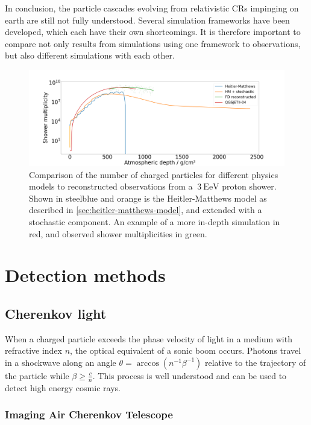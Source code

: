 In conclusion, the particle cascades evolving from relativistic CRs impinging on earth are still not fully understood. Several simulation frameworks have been 
developed, which each have their own shortcomings. It is therefore important to compare not only results from simulations using one framework to observations, but 
also different simulations with each other.

\begin{figure}
	\centering
	\includegraphics[width=1.0\textwidth]{./plots/validity_plot.png}
	\caption{Comparison of the number of charged particles for different physics models to reconstructed observations from a $~\SI{3}{\exa\electronvolt}$ proton 
	shower. Shown in steelblue and orange is the Heitler-Matthews model as described in \autoref{sec:heitler-matthews-model}, and extended with a stochastic 
	component. An example of a more in-depth simulation in red, and observed shower multiplicities in green.}
	\label{fig:model-validity}
\end{figure}

\section{Detection methods}
\label{sec:detection-methods}

\subsection{Cherenkov light}
\label{ssec:cherenkov-light}

When a charged particle exceeds the phase velocity of light in a medium with refractive index $n$, the optical equivalent of a sonic boom occurs. Photons travel in a 
shockwave along an angle $\theta = \arccos\left(n^{-1}\beta^{-1}\right)$ relative to the trajectory of the particle while $\beta \geq \frac{c}{n}$. This process is 
well understood and can be used to detect high energy cosmic rays.

\subsubsection{Imaging Air Cherenkov Telescope}

